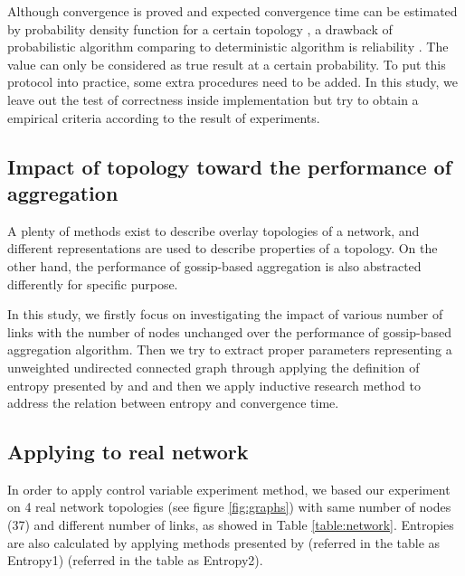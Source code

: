 Although convergence is proved and expected convergence time can be estimated by probability density function for a certain topology \cite{5929538}, a drawback of probabilistic algorithm comparing to deterministic algorithm is reliability \cite{Lynch:1996:DA:525656}. The value can only be considered as true result at a certain probability. To put this protocol into practice, some extra procedures need to be added. In this study, we leave out the test of correctness inside implementation but try to obtain a empirical criteria according to the result of experiments.

\subsection{Impact of topology toward the performance of aggregation}
A plenty of methods exist to describe overlay topologies of a network, and different representations are used to describe properties of a topology. On the other hand, the performance of gossip-based aggregation is also abstracted differently for specific purpose.

In this study, we firstly focus on investigating the impact of various number of links with the number of nodes unchanged over the performance of gossip-based aggregation algorithm. Then we try to extract proper parameters representing a unweighted undirected connected graph through applying the definition of entropy presented by \cite{entropy1} and \cite{entropy2} and then we apply inductive research method \cite{portal} to address the relation between entropy and convergence time.

\subsection{Applying to real network}
In order to apply control variable experiment method, we based our experiment on 4 real network topologies (see figure \ref{fig:graphs}) with same number of nodes (37) and different number of links, as showed in Table \ref{table:network}. Entropies are also calculated by applying methods presented by \cite{entropy1} (referred in the table as Entropy1) \cite{entropy2} (referred in the table as Entropy2).

